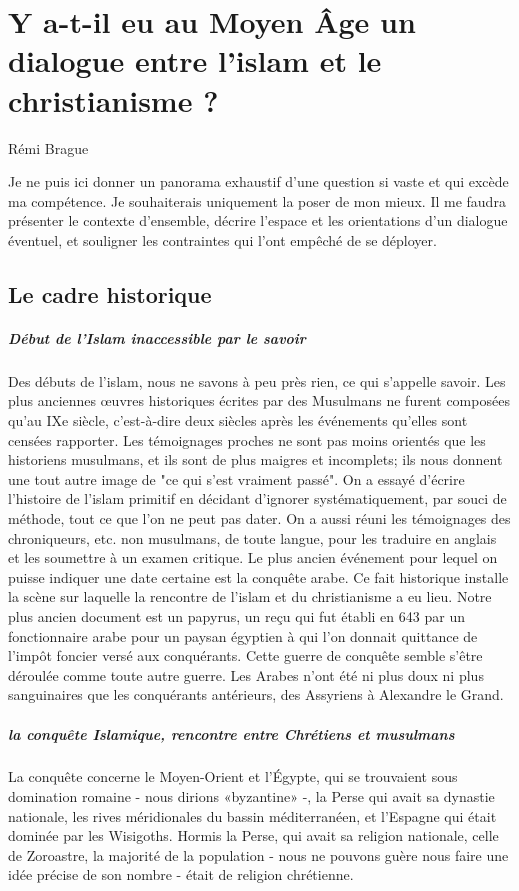 \chapter{Y a-t-il eu au Moyen Âge un dialogue
entre l’islam et le christianisme ?}

Rémi Brague

Je ne puis ici donner un panorama exhaustif d'une question si vaste et qui excède ma compétence. Je souhaiterais uniquement la poser de mon mieux. Il me faudra présenter le contexte d'ensemble, décrire l'espace et les orientations d'un dialogue éventuel, et souligner les contraintes qui l'ont empêché de se déployer.

\section{Le cadre historique}

\paragraph{Début de l'Islam inaccessible par le savoir}
Des débuts de l'islam, nous ne savons à peu près rien, ce qui s'appelle savoir. Les plus anciennes œuvres historiques écrites par des Musulmans ne furent composées qu'au IXe siècle, c'est-à-dire deux siècles après les événements qu'elles sont censées rapporter. Les témoignages proches ne sont pas moins orientés que les historiens musulmans, et ils sont de plus maigres et incomplets; ils nous donnent une tout autre image de "ce qui s'est vraiment passé". On a essayé d'écrire l'histoire de l'islam primitif en décidant d'ignorer systématiquement, par souci de méthode, tout ce que l'on ne peut pas dater. 
On a aussi réuni les témoignages des chroniqueurs, etc. non musulmans, de toute langue, pour les traduire en anglais et les soumettre à un examen critique.
Le plus ancien événement pour lequel on puisse indiquer une date certaine est la conquête arabe. Ce fait historique installe la scène sur laquelle la rencontre de l'islam et du christianisme a eu lieu. Notre plus ancien document est un papyrus, un reçu qui fut établi en 643 par un fonctionnaire arabe pour un paysan égyptien à qui l'on donnait quittance de l'impôt foncier versé aux conquérants. Cette guerre de conquête semble s'être déroulée comme toute autre guerre. Les Arabes n'ont été ni plus doux ni plus sanguinaires que les conquérants antérieurs, des Assyriens à Alexandre le Grand.

\paragraph{la conquête Islamique, rencontre entre Chrétiens et musulmans}
La conquête concerne le Moyen-Orient et l'Égypte, qui se trouvaient sous domination romaine - nous dirions «byzantine» -, la Perse qui avait sa dynastie nationale, les rives méridionales du bassin méditerranéen, et l'Espagne qui était dominée par les Wisigoths. Hormis la Perse, qui avait sa religion nationale, celle de Zoroastre, la majorité de la population - nous ne pouvons guère nous faire une idée précise de son nombre - était de religion chrétienne.

